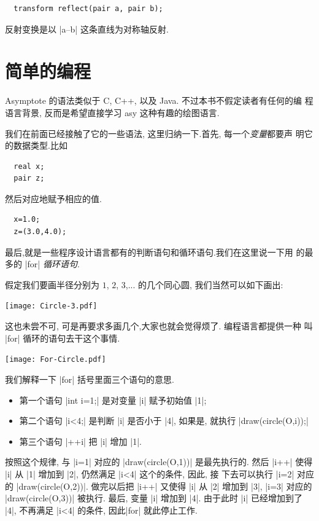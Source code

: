 \documentclass{ctexbook}
\begin{document}
\begin{lstlisting}
  transform reflect(pair a, pair b);
\end{lstlisting}
反射变换是以 |a--b| 这条直线为对称轴反射.


\section{简单的编程}
Asymptote 的语法类似于 C, C++, 以及 Java. 不过本书不假定读者有任何的编
程语言背景, 反而是希望直接学习 asy 这种有趣的绘图语言.

我们在前面已经接触了它的一些语法, 这里归纳一下.首先, 每一个\emph{变量}都要声
明它的数据类型.比如

\begin{lstlisting}
  real x;
  pair z;
\end{lstlisting}
然后对应地赋予相应的值.
\begin{lstlisting}
  x=1.0;
  z=(3.0,4.0);
\end{lstlisting}

最后,就是一些程序设计语言都有的判断语句和循环语句.我们在这里说一下用
的最多的 |for| \emph{循环语句}.

假定我们要画半径分别为 $1$, $2$, $3$,...
的几个同心圆, 我们当然可以如下画出:
\begin{center}\texttt{[image: Circle-3.pdf]}\end{center}%


这也未尝不可, 可是再要求多画几个,大家也就会觉得烦了. 编程语言都提供一种
叫 |for| 循环的语句去干这个事情.

\begin{center}\texttt{[image: For-Circle.pdf]}\end{center}%


我们解释一下 |for| 括号里面三个语句的意思.
\begin{itemize}
\item 第一个语句 |int i=1;| 是对变量 |i| 赋予初始值
  |1|;
\item 第二个语句 |i<4;| 是判断 |i| 是否小于 |4|,
  如果是, 就执行 |draw(circle(O,i));|
\item 第三个语句  |++i| 把 |i| 增加 |1|.
\end{itemize}

按照这个规律,  与 |i=1| 对应的 |draw(circle(O,1))| 是最先执行的. 然后
|i++| 使得 |i| 从 |1| 增加到 |2|, 仍然满足 |i<4| 这个的条件, 因此, 接
下去可以执行 |i=2| 对应的 |draw(circle(O,2))|. 做完以后把 |i++| 又使得
|i| 从 |2| 增加到 |3|, |i=3| 对应的 |draw(circle(O,3))| 被执行. 最后,
变量 |i| 增加到 |4|. 由于此时 |i| 已经增加到了 |4|, 不再满足 |i<4|
的条件, 因此|for| 就此停止工作.
\end{document}
